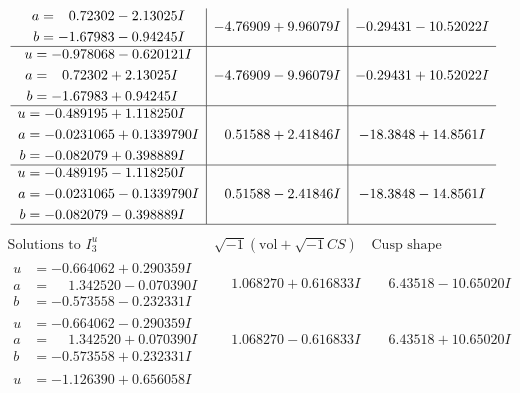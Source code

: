 \documentclass[1p]{elsarticle_modified}
\theoremstyle{definition}
\newcommand{\I}{\sqrt{-1}}
\begin{document}
$$\begin{array}{c|c|c}
\begin{aligned}
a &= \phantom{-}0.72302 - 2.13025 I \\
b &= -1.67983 - 0.94245 I\end{aligned}
 & -4.76909 + 9.96079 I & -0.29431 - 10.52022 I \\ \hline\begin{aligned}
u &= -0.978068 - 0.620121 I \\
a &= \phantom{-}0.72302 + 2.13025 I \\
b &= -1.67983 + 0.94245 I\end{aligned}
 & -4.76909 - 9.96079 I & -0.29431 + 10.52022 I \\ \hline\begin{aligned}
u &= -0.489195 + 1.118250 I \\
a &= -0.0231065 + 0.1339790 I \\
b &= -0.082079 + 0.398889 I\end{aligned}
 & \phantom{-}0.51588 + 2.41846 I & -18.3848 + 14.8561 I \\ \hline\begin{aligned}
u &= -0.489195 - 1.118250 I \\
a &= -0.0231065 - 0.1339790 I \\
b &= -0.082079 - 0.398889 I\end{aligned}
 & \phantom{-}0.51588 - 2.41846 I & -18.3848 - 14.8561 I\\
 \hline 
 \end{array}$$\newpage$$\begin{array}{c|c|c}  
\text{Solutions to }I^u_{3}& \I (\text{vol} + \sqrt{-1}CS) & \text{Cusp shape}\\
 \hline 
\begin{aligned}
u &= -0.664062 + 0.290359 I \\
a &= \phantom{-}1.342520 - 0.070390 I \\
b &= -0.573558 - 0.232331 I\end{aligned}
 & \phantom{-}1.068270 + 0.616833 I & \phantom{-}6.43518 - 10.65020 I \\ \hline\begin{aligned}
u &= -0.664062 - 0.290359 I \\
a &= \phantom{-}1.342520 + 0.070390 I \\
b &= -0.573558 + 0.232331 I\end{aligned}
 & \phantom{-}1.068270 - 0.616833 I & \phantom{-}6.43518 + 10.65020 I \\ \hline\begin{aligned}
u &= -1.126390 + 0.656058 I \\

\end{aligned}
\end{array}$$
\end{document}

